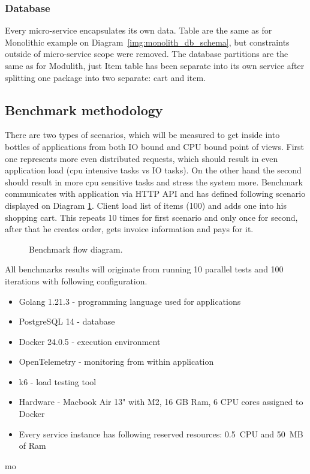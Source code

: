 \subsubsection{Database}
Every micro-service encapsulates its own data. Table are the same as for Monolithic example on Diagram~\ref{img:monolith_db_schema}, but constraints outside of micro-service scope were removed. The database partitions are the same as for Modulith, just Item table has been separate into its own service after splitting one package into two separate: cart and item.



\subsection{Benchmark methodology}
There are two types of scenarios, which will be measured to get inside into bottles of applications from both IO bound and CPU bound point of views. First one represents more even distributed requests, which should result in even application load (cpu intensive tasks vs IO tasks).
On the other hand the second should result in more cpu sensitive tasks and stress the system more.
Benchmark communicates with application via HTTP API and has defined following scenario displayed on Diagram \ref{img:benchmark_flow}.
Client load list of items (100) and adds one into his shopping cart. This repeats 10 times for first scenario and only once for second, after that he creates order, gets invoice information and pays for it.

\begin{figure}
    \centering
    
    \caption{Benchmark flow diagram. \label{img:benchmark_flow}}
\end{figure}

All benchmarks results will originate from running 10 parallel tests and 100 iterations with following configuration.
\begin{itemize}
    \item Golang 1.21.3 - programming language used for applications
    \item PostgreSQL 14 - database
    \item Docker 24.0.5 - execution environment
    \item OpenTelemetry - monitoring from within application
    \item k6 - load testing tool
    \item Hardware - Macbook Air 13" with M2, 16 GB Ram, 6 CPU cores assigned to Docker
    \item Every service instance has following reserved resources: 0.5~CPU and 50~MB of Ram
\end{itemize}mo

